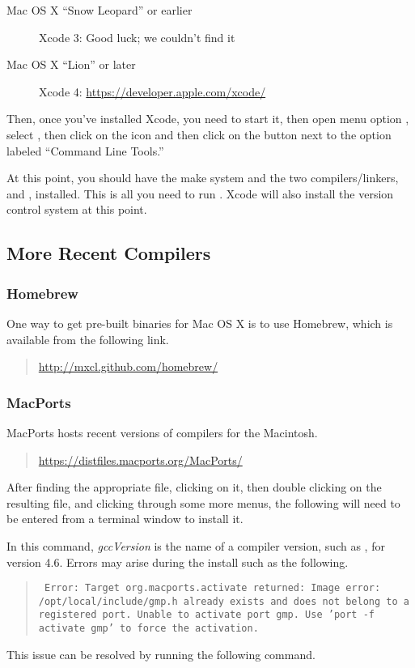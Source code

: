 \begin{description}
\item[Mac OS X ``Snow Leopard'' or earlier]
Xcode 3: Good luck; we couldn't find it
\item[Mac OS X ``Lion'' or later]
Xcode 4: \url{https://developer.apple.com/xcode/}
\end{description}

Then, once you've installed Xcode, you need to start it, then open
menu option , select , then click on the
 icon and then click on the  button next
to the option labeled ``Command Line Tools.''

At this point, you should have the make system  and the two
\Cpp compilers/linkers, \gpp and \clang, installed.  This is all you
need to run \Stan.  Xcode will also install the  version
control system at this point.

\subsection{More Recent Compilers}

\subsubsection{Homebrew}

One way to get pre-built binaries for Mac OS X is to use Homebrew,
which is available from the following link.
\begin{quote}
\url{http://mxcl.github.com/homebrew/}
\end{quote}

\subsubsection{MacPorts}

MacPorts hosts recent versions of compilers for the Macintosh.
%
\begin{quote}
\url{https://distfiles.macports.org/MacPorts/}
\end{quote}
%
After finding the appropriate  file, clicking on it, then
double clicking on the resulting  file, and clicking
through some more menus, the following will need to be entered from a
terminal window to install it.
%
\begin{quote}
\end{quote}
%
In this command, {\slshape gccVersion} is the name of a compiler
version, such as , for version 4.6.  Errors may arise
during the install such as the following.
%
\begin{quote}\small\tt
  Error: Target org.macports.activate returned: Image error:
  /opt/local/include/gmp.h already exists and does not belong to a
  registered port.  Unable to activate port gmp. Use 'port -f activate
  gmp' to force the activation.
\end{quote}
%
This issue can be resolved by running the following command.
%
\begin{quote}
\end{quote}
%


